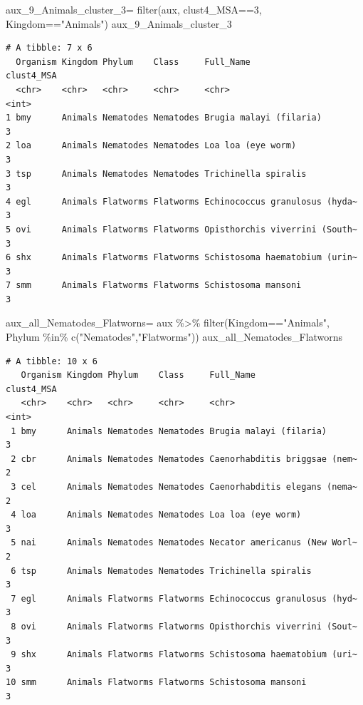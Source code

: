 \documentclass[
  letterpaper,
  DIV=11,
  numbers=noendperiod]{scrreprt}
\newenvironment{Shaded}{}{}
\newcommand{\DecValTok}[1]{\textcolor[rgb]{0.82,0.60,0.40}{#1}}
\newcommand{\FunctionTok}[1]{\textcolor[rgb]{0.38,0.69,0.94}{#1}}
\newcommand{\NormalTok}[1]{\textcolor[rgb]{0.67,0.70,0.75}{#1}}
\newcommand{\OtherTok}[1]{\textcolor[rgb]{0.15,0.68,0.38}{#1}}
\newcommand{\SpecialCharTok}[1]{\textcolor[rgb]{0.34,0.71,0.76}{#1}}
\newcommand{\StringTok}[1]{\textcolor[rgb]{0.60,0.76,0.47}{#1}}
\begin{document}
\begin{Shaded}
\begin{Highlighting}[]
\NormalTok{aux\_9\_Animals\_cluster\_3}\OtherTok{=} \FunctionTok{filter}\NormalTok{(aux,}
\NormalTok{                                clust4\_MSA}\SpecialCharTok{==}\DecValTok{3}\NormalTok{,}
\NormalTok{                                Kingdom}\SpecialCharTok{==}\StringTok{"Animals"}\NormalTok{)}
\NormalTok{aux\_9\_Animals\_cluster\_3}
\end{Highlighting}
\end{Shaded}

\begin{verbatim}
# A tibble: 7 x 6
  Organism Kingdom Phylum    Class     Full_Name                      clust4_MSA
  <chr>    <chr>   <chr>     <chr>     <chr>                               <int>
1 bmy      Animals Nematodes Nematodes Brugia malayi (filaria)                 3
2 loa      Animals Nematodes Nematodes Loa loa (eye worm)                      3
3 tsp      Animals Nematodes Nematodes Trichinella spiralis                    3
4 egl      Animals Flatworms Flatworms Echinococcus granulosus (hyda~          3
5 ovi      Animals Flatworms Flatworms Opisthorchis viverrini (South~          3
6 shx      Animals Flatworms Flatworms Schistosoma haematobium (urin~          3
7 smm      Animals Flatworms Flatworms Schistosoma mansoni                     3
\end{verbatim}

\begin{Shaded}
\begin{Highlighting}[]
\NormalTok{aux\_all\_Nematodes\_Flatworns}\OtherTok{=}\NormalTok{ aux }\SpecialCharTok{\%\textgreater{}\%} 
  \FunctionTok{filter}\NormalTok{(Kingdom}\SpecialCharTok{==}\StringTok{"Animals"}\NormalTok{,}
\NormalTok{         Phylum }\SpecialCharTok{\%in\%} \FunctionTok{c}\NormalTok{(}\StringTok{"Nematodes"}\NormalTok{,}\StringTok{"Flatworms"}\NormalTok{))}
\NormalTok{aux\_all\_Nematodes\_Flatworns}
\end{Highlighting}
\end{Shaded}

\begin{verbatim}
# A tibble: 10 x 6
   Organism Kingdom Phylum    Class     Full_Name                     clust4_MSA
   <chr>    <chr>   <chr>     <chr>     <chr>                              <int>
 1 bmy      Animals Nematodes Nematodes Brugia malayi (filaria)                3
 2 cbr      Animals Nematodes Nematodes Caenorhabditis briggsae (nem~          2
 3 cel      Animals Nematodes Nematodes Caenorhabditis elegans (nema~          2
 4 loa      Animals Nematodes Nematodes Loa loa (eye worm)                     3
 5 nai      Animals Nematodes Nematodes Necator americanus (New Worl~          2
 6 tsp      Animals Nematodes Nematodes Trichinella spiralis                   3
 7 egl      Animals Flatworms Flatworms Echinococcus granulosus (hyd~          3
 8 ovi      Animals Flatworms Flatworms Opisthorchis viverrini (Sout~          3
 9 shx      Animals Flatworms Flatworms Schistosoma haematobium (uri~          3
10 smm      Animals Flatworms Flatworms Schistosoma mansoni                    3
\end{verbatim}
\end{document}

